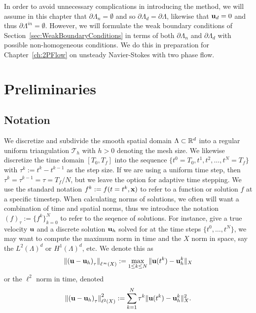 \documentclass[letterpaper]{erdc}
\begin{document}
In order to avoid unnecessary complications in introducing the method, we will assume in this chapter that $\partial\Lambda_n=\emptyset$ and so $\partial\Lambda_d=\partial\Lambda$, likewise that $\textbf{u}_d = 0$ and thus $\partial\Lambda^{in}=\emptyset$.  However, we will formulate the weak boundary conditions of Section~\ref{sec:WeakBoundaryConditions} in terms of both $\partial\Lambda_n$ and $\partial\Lambda_d$ with possible non-homogeneous conditions.  We do this in preparation for Chapter~\ref{ch:2PFlow} on unsteady Navier-Stokes with two phase flow.


%
%
%
\section{Preliminaries}


%
%
\subsection{Notation}
We discretize and subdivide the smooth spatial domain $\Lambda\subset \mathbb{R}^d$ into a regular uniform triangulation $\mathcal{T}_h$ with $h>0$ denoting the mesh size.  We likewise discretize the time domain $[T_0,T_f]$ into the sequence $\{ t^0=T_0, t^1, t^2, \dots, t^N = T_f\}$  with $\tau^k:= t^k-t^{k-1}$ as the step size.  If we are using a uniform time step, then $\tau^k = \tau^{k-1} = \tau = T_f/N$, but we leave the option for adaptive time stepping.  We use the standard notation $f^{k} := f(t=t^k,\textbf{x})$ to refer to a function or solution $f$ at a specific timestep.  When calculating norms of solutions, we often will want a combination of time and spatial norms,  thus we introduce the notation $\left( f \right)_{\tau}:= \{ f^k \}_{k=0}^{N}$ to refer to the seqence of solutions.  For instance, give a true velocity $\textbf{u}$ and a discrete solution $\textbf{u}_h$ solved for at the time steps $\{t^0,\dots, t^{N}\}$, we may want to compute the maximum norm in time and the $X$ norm in space, say the $L^2(\Lambda)^d$ or $H^1(\Lambda)^d$, etc.  We denote this as
\begin{equation}
  \left\| \left( \textbf{u} - \textbf{u}_h \right)_{\tau} \right\|_{\ell^{\infty}(X)} := \max_{1\leq k \leq N} \| \textbf{u}(t^{k}) - \textbf{u}_h^{k}\|_{X}
\end{equation}
or the $\ell^2$ norm in time, denoted
\begin{equation}
  \left\| \left( \textbf{u} - \textbf{u}_h \right)_{\tau} \right\|^2_{\ell^{2}(X)} :=  \sum_{k=1}^{N} \tau^{k}\| \textbf{u}(t^{k}) - \textbf{u}_h^{k}\|^2_{X}.
\end{equation}
\end{document}
